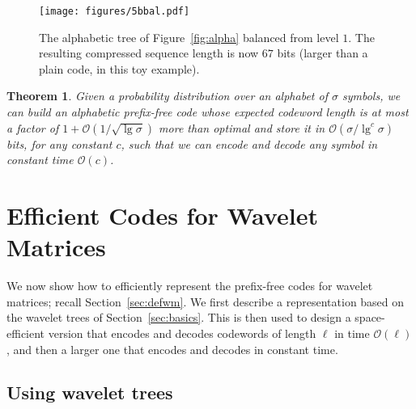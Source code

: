 \documentclass[preprint,12pt]{elsarticle}
\newcommand{\Oh}[1]{\ensuremath{\mathcal{O}\!\left({#1}\right)}}
\renewcommand{\log}{\lg}
\newtheorem{theorem}{Theorem}
\begin{document}
\begin{figure}[t]
\begin{center}
\texttt{[image: figures/5bbal.pdf]}
\end{center}
\vspace*{-5mm}
\caption{The alphabetic tree of Figure~\ref{fig:alpha} balanced from
level $1$. The resulting compressed sequence length is now $67$ bits (larger
than a plain code, in this toy example).}
\label{fig:alphabal}
\end{figure}

\begin{theorem}
\label{thm:nearly_optimal}
Given a probability distribution over an alphabet of $\sigma$ symbols, we can build an alphabetic prefix-free code whose expected codeword length is at most a factor of \(1 + \Oh{1 / \sqrt{\log \sigma}}\) more than optimal and store it in $\Oh{\sigma / \log^c \sigma}$ bits, for any constant $c$, such that we can encode and decode any symbol in constant time $\Oh{c}$.
\end{theorem}

\section{Efficient Codes for Wavelet Matrices}
\label{sec:matrices}

We now show how to efficiently represent the prefix-free codes for wavelet 
matrices; recall Section~\ref{sec:defwm}. We first describe a representation
based on the wavelet trees of Section~\ref{sec:basics}. This is then used to
design a space-efficient version that encodes and decodes codewords of length 
$\ell$ in time $\Oh{\ell}$, and then a larger one that encodes and decodes
in constant time.

\subsection{Using wavelet trees}
\end{document}
